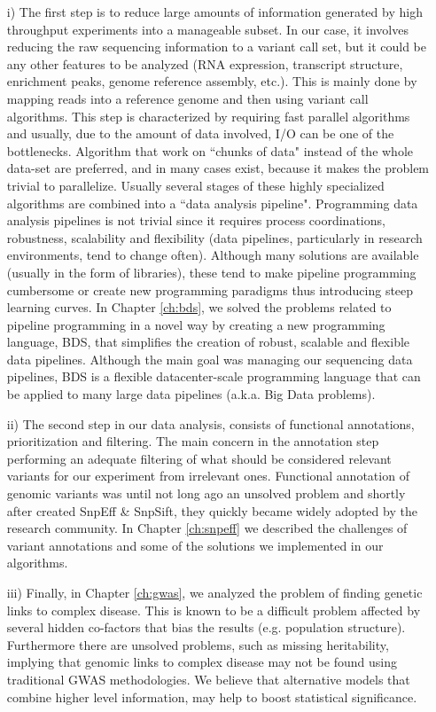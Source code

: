 \begin{itemize}
\item[i)] The first step is to reduce large amounts of information generated by high throughput experiments into a manageable subset. In our case, it involves reducing the raw sequencing information to a variant call set, but it could be any other features to be analyzed (RNA expression, transcript structure, enrichment peaks, genome reference assembly, etc.). This is mainly done by mapping reads into a reference genome and then using variant call algorithms. This step is characterized by requiring fast parallel algorithms and usually, due to the amount of data involved, I/O can be one of the bottlenecks. Algorithm that work on ``chunks of data" instead of the whole data-set are preferred, and in many cases exist, because it makes the problem trivial to parallelize. Usually several stages of these highly specialized algorithms are combined into a ``data analysis pipeline". Programming data analysis pipelines is not trivial since it requires process coordinations, robustness, scalability and flexibility (data pipelines, particularly in research environments, tend to change often). Although many solutions are available (usually in the form of libraries), these tend to make pipeline programming cumbersome or create new programming paradigms thus introducing steep learning curves. In Chapter \ref{ch:bds}, we solved the problems related to pipeline programming in a novel way by creating a new programming language, BDS, that simplifies the creation of robust, scalable and flexible data pipelines. Although the main goal was managing our sequencing data pipelines, BDS is a flexible datacenter-scale programming language that can be applied to many large data pipelines (a.k.a. Big Data problems).

\item[ii)] The second step in our data analysis, consists of functional annotations, prioritization and filtering. The main concern in the annotation step performing an adequate filtering of what should be considered relevant variants for our experiment from irrelevant ones. Functional annotation of genomic variants was until not long ago an unsolved problem and shortly after created SnpEff \& SnpSift, they quickly became widely adopted by the research community. In Chapter \ref{ch:snpeff} we described the challenges of variant annotations and some of the solutions we implemented in our algorithms.

\item[iii)] Finally, in Chapter \ref{ch:gwas}, we analyzed the problem of  finding genetic links to complex disease. This is known to be a difficult problem affected by several hidden co-factors that bias the results (e.g. population structure). Furthermore there are unsolved problems, such as missing heritability, implying that genomic links to complex disease may not be found using traditional GWAS methodologies. We believe that alternative models that combine higher level information, may help to boost statistical significance. 


\end{itemize}
